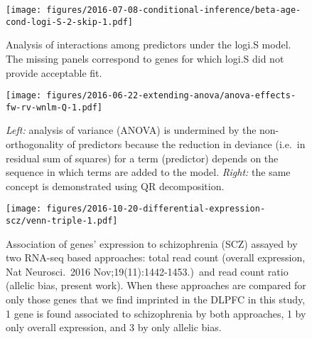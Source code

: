 \documentclass[12pt,letterpaper]{article}
\begin{document}
\begin{figure}[h]
\begin{center}
\texttt{[image: figures/2016-07-08-conditional-inference/beta-age-cond-logi-S-2-skip-1.pdf]}
\end{center}
\caption{
Analysis of interactions among predictors under the logi.S model.  The missing
panels correspond to genes for which logi.S did not provide acceptable fit.
}
\label{fig:interaction-logi.S}
\end{figure}

\begin{figure}[h]
\begin{center}
\texttt{[image: figures/2016-06-22-extending-anova/anova-effects-fw-rv-wnlm-Q-1.pdf]}
\end{center}
\caption{
\emph{Left:} analysis of variance (ANOVA) is undermined by the non-orthogonality of
predictors because the reduction in deviance (i.e.~in residual sum of squares)
for a term (predictor) depends on the sequence in which terms are added to the
model.  \emph{Right:} the same concept is demonstrated using QR decomposition.
}
\label{fig:anova}
\end{figure}

\begin{figure}[h]
\begin{center}
\texttt{[image: figures/2016-10-20-differential-expression-scz/venn-triple-1.pdf]}
\end{center}
\caption{
Association of genes' expression to schizophrenia (SCZ) assayed by two RNA-seq
based approaches: total read count (overall expression, Nat Neurosci.~2016
Nov;19(11):1442-1453.)~and read count ratio
(allelic bias, present work).  When these approaches are compared for only
those genes that we find imprinted in the DLPFC in this study, 1 gene is found
associated to schizophrenia by both approaches, 1 by only overall expression,
and 3 by only allelic bias.
}
\label{fig:diff-exp-scz}
\end{figure}

\end{document}
